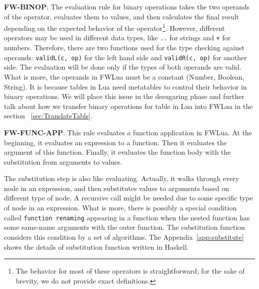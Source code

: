 {\bf FW-BINOP}: The evaluation rule for binary operations takes the two operands of the operator, evaluates them to values, and then calculates the final result depending on the expected behavior of the operator\footnote{
The behavior for most of these operators is straightforward;
for the sake of brevity, we do not provide exact definitions.
}.
However, different operators may be used in different data types, like {\tt ..} for strings and {\tt +} for numbers. Therefore, there are two functions used for the type checking against operands: {\tt validL(c, op)} for the left hand side and {\tt validR(c, op)} for another side. The evaluation will be done only if the types of both operands are valid.
What is more, the operands in FWLua must be a constant (Number, Boolean, String). It is because tables in Lua need metatables to control their behavior in binary operations. We will place this issue in the desugaring phase and further talk about how we transfer binary operations for table in Lua into FWLua in the section ~\ref{sec:TranslateTabls}.

{\bf FW-FUNC-APP}: This rule evaluates a function application in FWLua. At the beginning, it evaluates an expression to a function. Then it evaluates the argument of this function. Finally, it evaluates the function body with the substitution from arguments to values. 

The substitution step is also like evaluating. Actually, it walks through every node in an expression, and then substitutes values to arguments based on different type of node. A recursive call might be needed due to some specific type of node in an expression.
What is more, there is possibly a special condition called {\tt function renaming} appearing in a function when the nested function has some same-name arguments with the outer function. The substitution function considers this condition by a set of algorithms. The Appendix~\ref{app:substitute} shows the details of substitution function written in Haskell.




